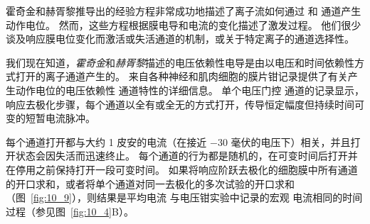 霍奇金和赫胥黎推导出的经验方程非常成功地描述了离子流如何通过  和  通道产生动作电位。
然而，这些方程根据膜电导和电流的变化描述了激发过程。
他们很少谈及响应膜电位变化而激活或失活通道的机制，或关于特定离子的通道选择性。


我们现在知道，\textit{霍奇金}和\textit{赫胥黎}描述的电压依赖性电导是由以电压和时间依赖性方式打开的离子通道产生的。
来自各种神经和肌肉细胞的膜片钳记录提供了有关产生动作电位的电压依赖性  通道特性的详细信息。
单个电压门控  通道的记录显示，响应去极化步骤，每个通道以全有或全无的方式打开，传导恒定幅度但持续时间可变的短暂电流脉冲。


每个通道打开都与大约 1 皮安的电流（在接近 −30 毫伏的电压下）相关，并且打开状态会因失活而迅速终止。 
每个通道的行为都是随机的，在可变时间后打开并在停用之前保持打开一段可变时间。
如果将响应阶跃去极化的细胞膜中所有通道的开口求和，或者将单个通道对同一去极化的多次试验的开口求和（图~\ref{fig:10_9}），则结果是平均电流 与电压钳实验中记录的宏观  电流相同的时间过程（参见图~\ref{fig:10_4}B）。


